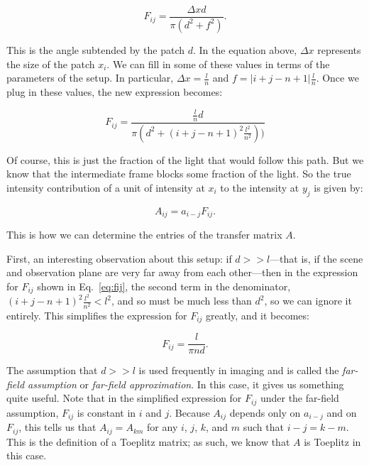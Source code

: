 \documentclass[11pt]{article}
\begin{document}
\begin{equation}
    F_{ij} = \frac{\Delta x d}{\pi (d^2 + f^2)}.
\end{equation}

This is the angle subtended by the patch $d$. In the equation above, $\Delta x$ represents the size of the patch $x_i$. We can fill in some of these values in terms of the parameters of the setup. In particular, $\Delta x = \frac{l}{n}$ and $f = |i+j-n+1|\frac{l}{n}$. Once we plug in these values, the new expression becomes:

\begin{equation}
    \label{eq:fij}
    F_{ij} = \frac{\frac{l}{n} d}{\pi (d^2 + (i+j-n+1)^2\frac{l^2}{n^2}))}
\end{equation}

Of course, this is just the fraction of the light that would follow this path. But we know that the intermediate frame blocks some fraction of the light. So the true intensity contribution of a unit of intensity at $x_i$ to the intensity at $y_j$ is given by:

\begin{equation}
    A_{ij} = a_{i-j} F_{ij}.
\end{equation}

This is how we can determine the entries of the transfer matrix $A$.

First, an interesting observation about this setup: if $d >> l$---that is, if the scene and observation plane are very far away from each other---then in the expression for $F_{ij}$ shown in Eq.~\ref{eq:fij}, the second term in the denominator, $(i+j-n+1)^2\frac{l^2}{n^2} < l^2$, and so must be much less than $d^2$, so we can ignore it entirely. This simplifies the expression for $F_{ij}$ greatly, and it becomes:

\begin{equation}
    \label{eq:fijff}
    F_{ij} = \frac{l}{\pi nd}.
\end{equation}

The assumption that $d >> l$ is used frequently in imaging and is called the \emph{far-field assumption} or \emph{far-field approximation}. In this case, it gives us something quite useful. Note that in the simplified expression for $F_{ij}$ under the far-field assumption, $F_{ij}$ is constant in $i$ and $j$. Because $A_{ij}$ depends only on $a_{i-j}$ and on $F_{ij}$, this tells us that $A_{ij} = A_{km}$ for any $i$, $j$, $k$, and $m$ such that $i-j = k-m$. This is the definition of a Toeplitz matrix; as such, we know that $A$ is Toeplitz in this case.
\end{document}
